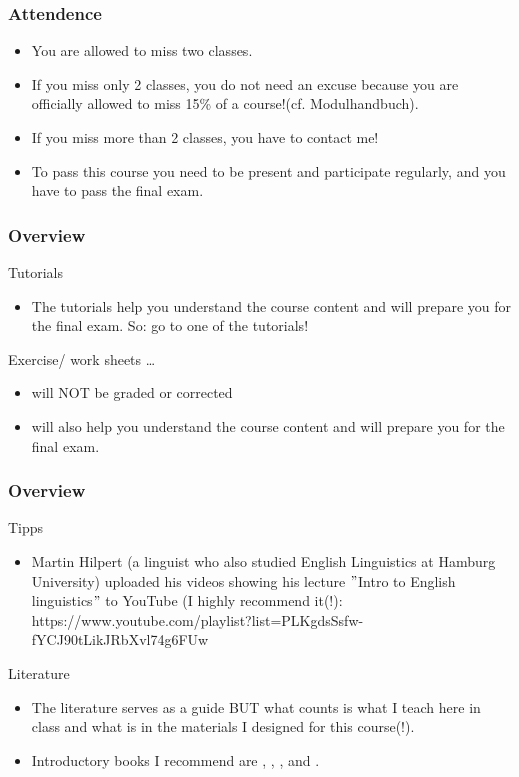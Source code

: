\documentclass[12pt, table]{beamer}
\begin{document}
\begin{frame}
\frametitle{Attendence}
\begin{itemize} 
\item You are allowed to miss two classes.
\item If you miss only 2 classes, you do not need an excuse because you are officially allowed to miss 15\% of a course!(cf. Modulhandbuch).
\item If you miss more than 2 classes, you have to contact me!
\item To pass this course you need to be present and participate regularly, and you have to pass the final exam.
\end{itemize}
\end{frame}

\begin{frame}
\frametitle{Overview}
Tutorials\\
\begin{itemize}
\item The tutorials help you understand the course content and will prepare you for the final exam. So: go to one of the tutorials!
\end{itemize}
Exercise/ work sheets \dots
\begin{itemize}
\item will NOT be graded or corrected
\item will also help you understand the course content and will prepare you for the final exam.
\end{itemize}
\end{frame}

\begin{frame}
\frametitle{Overview}
Tipps
\begin{itemize}
\item Martin Hilpert (a linguist who also studied English Linguistics at Hamburg University) uploaded his videos showing his lecture $"$Intro to  English linguistics$"$ to YouTube (I highly recommend it(!): \footnotesize{https://www.youtube.com/playlist?list=PLKgdsSsfw-fYCJ90tLikJRbXvl74g6FUw}
\end{itemize}
Literature
\begin{itemize}
\item The literature serves as a guide BUT what counts is what I teach here in class and what is in the materials I designed for this course(!). 
\item Introductory books I recommend are \citet{berg2013intro}, \citet{meyer2010introducing}, \citet{fromkin2013introduction}, and \citet{kortmann2001linguistik}.
\end{itemize}
\end{frame}
\end{document}
